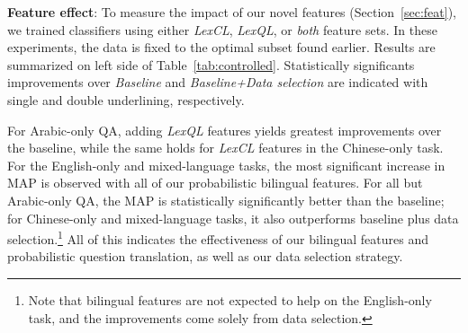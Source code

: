 \documentclass{sig-alternate-05-2015}
\begin{document}

\textbf{Feature effect}: To measure the impact of our novel features (Section~\ref{sec:feat}), we trained classifiers using either
\emph{LexCL}, \emph{LexQL}, or \emph{both} feature sets. In these experiments, the data is fixed to the
optimal subset found earlier. Results are summarized on left side of Table~\ref{tab:controlled}. Statistically
significants improvements over {\em Baseline} and {\em Baseline+Data selection} are indicated with single 
and double underlining, respectively.
 
For Arabic-only QA, adding \emph{LexQL} features yields greatest improvements over the baseline, 
while the same holds for \emph{LexCL} features in the Chinese-only task.
For the English-only and mixed-language tasks, the most significant increase in MAP is observed 
with all of our probabilistic bilingual features. For all but Arabic-only QA, the MAP is statistically significantly 
better than the baseline; for Chinese-only and mixed-language tasks, it also outperforms baseline 
plus data selection.\footnote{Note that bilingual features are not expected to help on the 
English-only task, and the improvements come solely from data selection.}
All of this indicates the effectiveness of our bilingual features and probabilistic question translation, 
as well as our data selection strategy.
\end{document}
